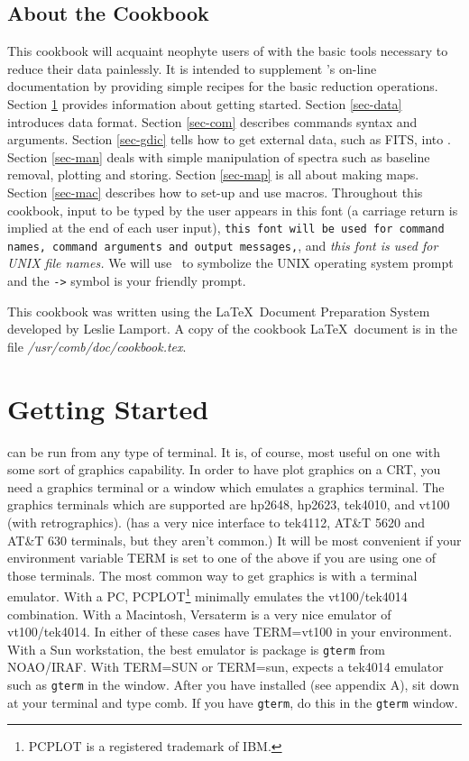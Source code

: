 \subsection{About the Cookbook}
This cookbook will acquaint neophyte users of \COMB with the
basic tools necessary to reduce their data painlessly. It is intended
to supplement \C's on-line documentation by providing simple recipes
for the basic reduction operations. Section \ref{sec-start} provides 
information about getting started. Section \ref{sec-data} introduces data 
format. 
Section \ref{sec-com} describes commands syntax and arguments. Section 
\ref{sec-gdic} tells 
how to get external data, such as FITS, into \C. Section \ref{sec-man}
deals with simple manipulation of spectra 
such as baseline removal, plotting and storing. Section \ref{sec-map}
is all about making maps. Section 
\ref{sec-mac} describes how to set-up and use macros. 
Throughout this cookbook, {\us input to
be typed by the user appears in this font (a carriage return is implied
at the end of each user input)}, {\tt this font will be used for command 
names, command arguments and \COMB output messages,}, and {\sl this font
is used for UNIX file names.} We will use \dol\ to symbolize the UNIX 
operating system prompt and the {\tt ->} symbol is your friendly \COMB prompt.

This cookbook was written using the \LaTeX\ Document Preparation System developed
by Leslie Lamport. A copy of the cookbook \LaTeX\ document is in the file 
{\sl /usr/comb/doc/cookbook.tex}.

\section{Getting Started}
\label{sec-start}

\COMB can be run from any type of terminal. It is, of course, most useful 
on one with some sort of graphics capability.
In order to have \COMB plot graphics on a CRT, you need a graphics terminal
or a window which emulates a graphics terminal. The graphics terminals which
are supported are hp2648, hp2623, tek4010, and vt100 (with retrographics). 
(\COMB has a very nice interface to tek4112, AT\&T 5620 and 
AT\&T 630 terminals, but they aren't common.) It will be most convenient if 
your environment variable TERM
is set to one of the above if you are using one of those terminals. The most
common way to get \COMB graphics is with a terminal emulator. With a PC,
PCPLOT\footnote{PCPLOT is a registered trademark of IBM.} 
minimally emulates the vt100/tek4014 combination. With a Macintosh,
Versaterm is a very nice emulator of vt100/tek4014. 
In either of these cases have TERM=vt100 in your environment. With a Sun 
workstation, the best emulator
is package is {\tt gterm} from NOAO/IRAF. With TERM=SUN or TERM=sun, \COMB
expects a tek4014 emulator such as {\tt gterm} in the window.
After you have installed \COMB (see appendix A), sit down at your terminal 
and type {\us comb}.  If you have {\tt gterm}, do this in the {\tt gterm} window. 
\smallskip
{}
\medskip
\dispz{}
\smallskip

